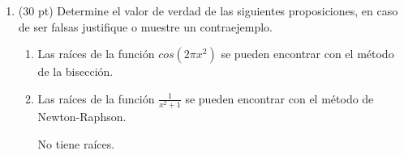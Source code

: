 \documentclass[11pt]{article}
\begin{document}
\begin{enumerate}
\item (30 pt) Determine el valor de verdad de las siguientes proposiciones, en caso de ser falsas justifique o muestre un contraejemplo.
\begin{enumerate}
\item
{} 
    \begin{minipage}{0.4\textwidth}
	Las ra\'ices de la funci\'on $cos(2\pi x^2)$ se pueden encontrar con el m\'etodo de la bisecci\'on.
    \end{minipage} 
    \begin{minipage}{0.4\textwidth}
\fbox{5pt}
    \end{minipage}
%
\item
\fbox{ \begin{minipage}{1cm}   \hfill\vspace{1cm}   		
    \end{minipage} } 
    \begin{minipage}{0.4\textwidth}
	Las ra\'ices de la funci\'on $\frac{1}{x^2+1}$ se pueden encontrar con el m\'etodo de Newton-Raphson.
    \end{minipage} 
    \begin{minipage}{0.4\textwidth}
    No tiene raíces.
    

\end{minipage}
\end{enumerate}
\end{enumerate}
\end{document}
